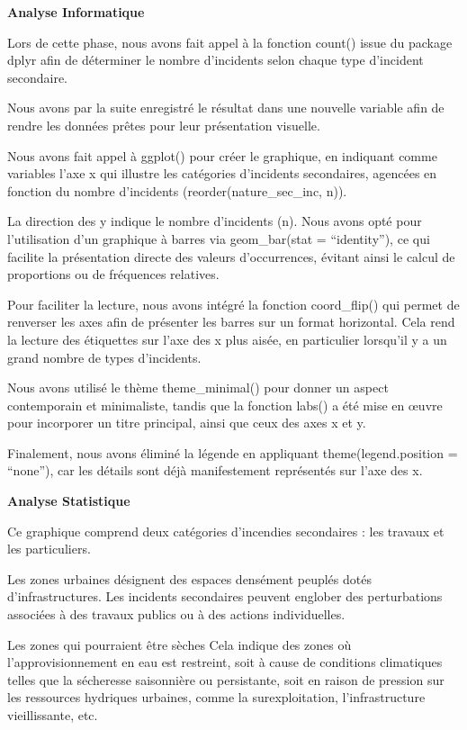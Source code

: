 \documentclass[
]{article}
\begin{document}
\textbf{Analyse Informatique}

Lors de cette phase, nous avons fait appel à la fonction count() issue
du package dplyr afin de déterminer le nombre d'incidents selon chaque
type d'incident secondaire.

Nous avons par la suite enregistré le résultat dans une nouvelle
variable afin de rendre les données prêtes pour leur présentation
visuelle.

Nous avons fait appel à ggplot() pour créer le graphique, en indiquant
comme variables l'axe x qui illustre les catégories d'incidents
secondaires, agencées en fonction du nombre d'incidents
(reorder(nature\_sec\_inc, n)).

La direction des y indique le nombre d'incidents (n). Nous avons opté
pour l'utilisation d'un graphique à barres via geom\_bar(stat =
``identity''), ce qui facilite la présentation directe des valeurs
d'occurrences, évitant ainsi le calcul de proportions ou de fréquences
relatives.

Pour faciliter la lecture, nous avons intégré la fonction coord\_flip()
qui permet de renverser les axes afin de présenter les barres sur un
format horizontal. Cela rend la lecture des étiquettes sur l'axe des x
plus aisée, en particulier lorsqu'il y a un grand nombre de types
d'incidents.

Nous avons utilisé le thème theme\_minimal() pour donner un aspect
contemporain et minimaliste, tandis que la fonction labs() a été mise en
œuvre pour incorporer un titre principal, ainsi que ceux des axes x et
y.

Finalement, nous avons éliminé la légende en appliquant
theme(legend.position = ``none''), car les détails sont déjà
manifestement représentés sur l'axe des x.

\textbf{Analyse Statistique}

Ce graphique comprend deux catégories d'incendies secondaires : les
travaux et les particuliers.

Les zones urbaines désignent des espaces densément peuplés dotés
d'infrastructures. Les incidents secondaires peuvent englober des
perturbations associées à des travaux publics ou à des actions
individuelles.

Les zones qui pourraient être sèches Cela indique des zones où
l'approvisionnement en eau est restreint, soit à cause de conditions
climatiques telles que la sécheresse saisonnière ou persistante, soit en
raison de pression sur les ressources hydriques urbaines, comme la
surexploitation, l'infrastructure vieillissante, etc.
\end{document}
